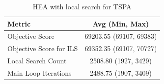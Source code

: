 \begin{table}[h!]
\centering
\begin{tabular}{lc}
\hline
Metric & Avg (Min, Max) \\
\hline
Objective Score & 69203.55 (69107, 69383) \\
Objective Score for ILS & 69352.35 (69107, 70727) \\
Local Search Count & 2508.80 (1927, 3429) \\
Main Loop Iterations & 2488.75 (1907, 3409) \\
\hline
\end{tabular}
\caption{HEA with local search for TSPA}
\label{tab:TSPA_hea_with_ls_scores}
\end{table}
